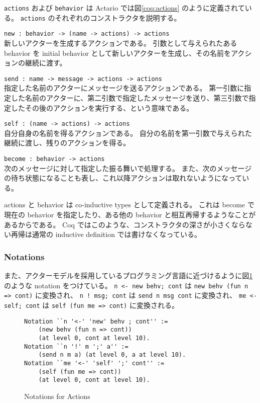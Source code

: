 \texttt{actions} および \texttt{behavior} は Actario では図\ref{coq:actions} のように定義されている。
\texttt{actions} のそれぞれのコンストラクタを説明する。

\begin{list}{}{%
    \setlength{\leftmargin}{1.5em}
    \setlength{\itemindent}{-1.5em}
}
\item \lstinline|new : behavior -> (name -> actions) -> actions|\\
  新しいアクターを生成するアクションである。
  引数として与えられたある behavior を initial behavior として新しいアクターを生成し、その名前をアクションの継続に渡す。
\item \lstinline|send : name -> message -> actions -> actions|\\
  指定した名前のアクターにメッセージを送るアクションである。
  第一引数に指定した名前のアクターに、第二引数で指定したメッセージを送り、第三引数で指定したその後のアクションを実行する、という意味である。
\item \lstinline|self : (name -> actions) -> actions| \\
  自分自身の名前を得るアクションである。
  自分の名前を第一引数で与えられた継続に渡し、残りのアクションを得る。
\item \lstinline|become : behavior -> actions| \\
  次のメッセージに対して指定した振る舞いで処理する。
  また、次のメッセージの待ち状態になることも表し、これ以降アクションは取れないようになっている。
\end{list}

actions と behavior は co-inductive types として定義される。
これは become で現在の behavior を指定したり、ある他の behavior と相互再帰するようなことがあるからである。
Coq ではこのような、コンストラクタの深さが小さくならない再帰は通常の inductive definition では書けなくなっている。

\subsubsection{Notations}

また、アクターモデルを採用しているプログラミング言語に近づけるように図\ref{coq:notation}のような notation をつけている。
\lstinline|n <- new behv; cont| は \lstinline|new behv (fun n => cont)| に変換され、
\lstinline|n ! msg; cont| は \lstinline|send n msg cont| に変換され、
\lstinline|me <- self; cont| は \lstinline|self (fun me => cont)| に変換される。

\begin{figure}[tb]
\begin{lstlisting}
Notation ``n '<-' 'new' behv ; cont'' :=
    (new behv (fun n => cont))
    (at level 0, cont at level 10).
Notation ``n '!' m ';' a'' :=
    (send n m a) (at level 0, a at level 10).
Notation ``me '<-' 'self' ';' cont'' :=
    (self (fun me => cont))
    (at level 0, cont at level 10).
\end{lstlisting}
\caption{Notations for Actions}\label{coq:notation}
\end{figure}
